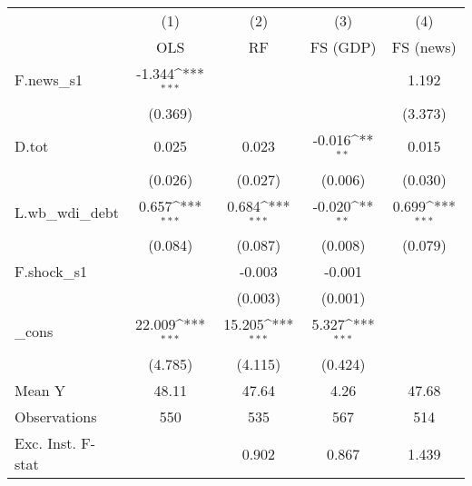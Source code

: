 {
\def\sym#1{\ifmmode^{#1}\else\(^{#1}\)\fi}
\begin{tabular}{l*{4}{c}}
\toprule
            &\multicolumn{1}{c}{(1)}&\multicolumn{1}{c}{(2)}&\multicolumn{1}{c}{(3)}&\multicolumn{1}{c}{(4)}\\
            &\multicolumn{1}{c}{OLS}&\multicolumn{1}{c}{RF}&\multicolumn{1}{c}{FS (GDP)}&\multicolumn{1}{c}{FS (news)}\\
\midrule
F.news\_s1   &      -1.344\sym{***}&                     &                     &       1.192         \\
            &     (0.369)         &                     &                     &     (3.373)         \\
\addlinespace
D.tot       &       0.025         &       0.023         &      -0.016\sym{**} &       0.015         \\
            &     (0.026)         &     (0.027)         &     (0.006)         &     (0.030)         \\
\addlinespace
L.wb\_wdi\_debt&       0.657\sym{***}&       0.684\sym{***}&      -0.020\sym{**} &       0.699\sym{***}\\
            &     (0.084)         &     (0.087)         &     (0.008)         &     (0.079)         \\
\addlinespace
F.shock\_s1  &                     &      -0.003         &      -0.001         &                     \\
            &                     &     (0.003)         &     (0.001)         &                     \\
\addlinespace
\_cons      &      22.009\sym{***}&      15.205\sym{***}&       5.327\sym{***}&                     \\
            &     (4.785)         &     (4.115)         &     (0.424)         &                     \\
\midrule
Mean Y      &       48.11         &       47.64         &        4.26         &       47.68         \\
Observations&         550         &         535         &         567         &         514         \\
Exc. Inst. F-stat&                     &       0.902         &       0.867         &       1.439         \\
\bottomrule
\end{tabular}
}
